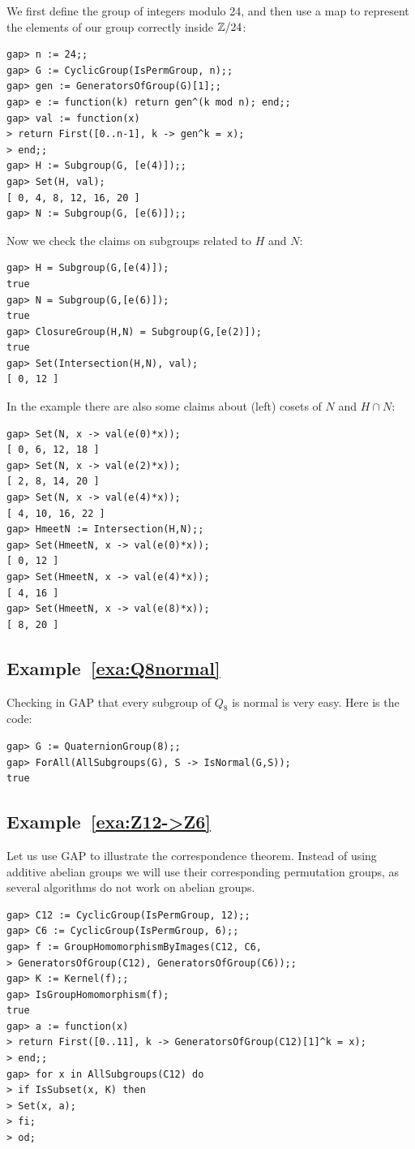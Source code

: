 We first define the group of integers modulo 24,
and then use a map to represent the elements
of our group correctly inside $\mathbb{Z}/24$:
\begin{lstlisting}
gap> n := 24;;
gap> G := CyclicGroup(IsPermGroup, n);;
gap> gen := GeneratorsOfGroup(G)[1];;
gap> e := function(k) return gen^(k mod n); end;;
gap> val := function(x) 
> return First([0..n-1], k -> gen^k = x); 
> end;;
gap> H := Subgroup(G, [e(4)]);;
gap> Set(H, val);
[ 0, 4, 8, 12, 16, 20 ]
gap> N := Subgroup(G, [e(6)]);;
\end{lstlisting}
Now we check the claims on subgroups
related to $H$ and $N$:
\begin{lstlisting}
gap> H = Subgroup(G,[e(4)]);
true
gap> N = Subgroup(G,[e(6)]);
true
gap> ClosureGroup(H,N) = Subgroup(G,[e(2)]);
true
gap> Set(Intersection(H,N), val);
[ 0, 12 ]
\end{lstlisting}
In the example there are also some claims about (left)
cosets of $N$ and $H\cap N$:
\begin{lstlisting}
gap> Set(N, x -> val(e(0)*x));
[ 0, 6, 12, 18 ]
gap> Set(N, x -> val(e(2)*x));
[ 2, 8, 14, 20 ]
gap> Set(N, x -> val(e(4)*x));
[ 4, 10, 16, 22 ]
gap> HmeetN := Intersection(H,N);;
gap> Set(HmeetN, x -> val(e(0)*x));
[ 0, 12 ]
gap> Set(HmeetN, x -> val(e(4)*x));
[ 4, 16 ]
gap> Set(HmeetN, x -> val(e(8)*x));
[ 8, 20 ]
\end{lstlisting}


\subsection*{Example~\ref{exa:Q8normal}}

Checking in GAP that every subgroup of $Q_8$
is normal is very easy. Here is the code:
\begin{lstlisting}
gap> G := QuaternionGroup(8);;
gap> ForAll(AllSubgroups(G), S -> IsNormal(G,S));
true
\end{lstlisting}

\subsection*{Example~\ref{exa:Z12->Z6}}

Let us use GAP to illustrate the correspondence
theorem. Instead of using
additive abelian groups we will
use their corresponding permutation groups, as
several algorithms do not work
on abelian groups.
\begin{lstlisting}
gap> C12 := CyclicGroup(IsPermGroup, 12);;
gap> C6 := CyclicGroup(IsPermGroup, 6);;
gap> f := GroupHomomorphismByImages(C12, C6,
> GeneratorsOfGroup(C12), GeneratorsOfGroup(C6));;
gap> K := Kernel(f);;
gap> IsGroupHomomorphism(f);
true
gap> a := function(x)
> return First([0..11], k -> GeneratorsOfGroup(C12)[1]^k = x);
> end;;
gap> for x in AllSubgroups(C12) do
> if IsSubset(x, K) then
> Set(x, a);
> fi;
> od;
\end{lstlisting}

